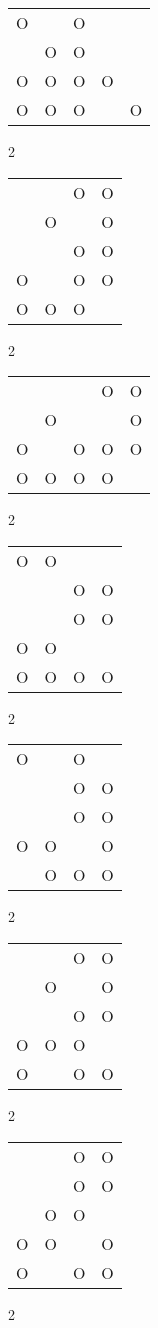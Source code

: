 \begin{tabular}{|m{0.2cm}m{0.2cm}m{0.2cm}m{0.2cm}m{0.2cm}|}\hline
O& &O& & \\
 &O&O& & \\
O&O&O&O& \\
O&O&O& &O\\
\hline\end{tabular}2
\begin{tabular}{|m{0.2cm}m{0.2cm}m{0.2cm}m{0.2cm}|}\hline
 & &O&O\\
 &O& &O\\
 & &O&O\\
O& &O&O\\
O&O&O& \\
\hline\end{tabular}2
\begin{tabular}{|m{0.2cm}m{0.2cm}m{0.2cm}m{0.2cm}m{0.2cm}|}\hline
 & & &O&O\\
 &O& & &O\\
O& &O&O&O\\
O&O&O&O& \\
\hline\end{tabular}2
\begin{tabular}{|m{0.2cm}m{0.2cm}m{0.2cm}m{0.2cm}|}\hline
O&O& & \\
 & &O&O\\
 & &O&O\\
O&O& & \\
O&O&O&O\\
\hline\end{tabular}2
\begin{tabular}{|m{0.2cm}m{0.2cm}m{0.2cm}m{0.2cm}|}\hline
O& &O& \\
 & &O&O\\
 & &O&O\\
O&O& &O\\
 &O&O&O\\
\hline\end{tabular}2
\begin{tabular}{|m{0.2cm}m{0.2cm}m{0.2cm}m{0.2cm}|}\hline
 & &O&O\\
 &O& &O\\
 & &O&O\\
O&O&O& \\
O& &O&O\\
\hline\end{tabular}2
\begin{tabular}{|m{0.2cm}m{0.2cm}m{0.2cm}m{0.2cm}|}\hline
 & &O&O\\
 & &O&O\\
 &O&O& \\
O&O& &O\\
O& &O&O\\
\hline\end{tabular}2
